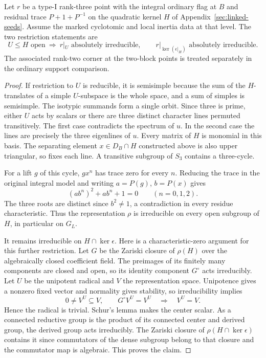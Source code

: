 \begin{lemma}
\label{lem:rank-three-host-restriction}
Let \(r\) be a type-I rank-three point with the integral
ordinary flag at \(B\) and residual trace \(P+1+P^{-1}\) on the
quadratic kernel \(H\) of Appendix~\ref{sec:linked-seeds}.
Assume the marked cyclotomic and local inertia data at that level.
The two restriction statements are
\[
 U\le H\text{ open}\ \Longrightarrow\ r|_U\text{ absolutely irreducible},
 \qquad r|_{\ker(\epsilon|_H)}\text{ absolutely irreducible}.
\] The associated
rank-two corner at the two-block points is treated separately
in the ordinary support comparison.
\end{lemma}

\begin{proof}
If restriction to \(U\) is reducible, it is semisimple because
the sum of the \(H\)-translates of a simple \(U\)-subspace
is the whole space, and a sum of simples is semisimple.
The isotypic summands form a single orbit. Since three
is prime, either \(U\) acts by scalars or there are three
distinct character lines permuted transitively. The first
case contradicts the spectrum of \(u\). In the second case
the lines are precisely the three eigenlines of \(u\).
Every matrix of \(H\) is monomial in this basis. The
separating element \(x\in D_B\cap H\) constructed above is
also upper triangular, so fixes each line. A transitive
subgroup of \(S_3\) contains a three-cycle.

For a lift \(g\)
of this cycle, \(gx^n\) has trace zero for every \(n\).
Reducing the trace in the original integral model and writing
\(a=P(g)\), \(b=P(x)\) gives
\[
         (ab^n)^2+ab^n+1=0\qquad(n=0,1,2).
\]
The three roots are distinct since \(b^2\ne1\), a
contradiction in every residue characteristic. Thus the
representation \(\rho\) is irreducible on every open
subgroup of \(H\), in particular on \(G_L\).

It remains irreducible on \(H\cap\ker\epsilon\). Here is a
characteristic-zero argument for this further restriction.
Let \(G\) be the Zariski closure of \(\rho(H)\) over the
algebraically closed coefficient field. The preimages of
its finitely many components are closed and open, so its
identity component \(G^\circ\) acts irreducibly. Let \(U\) be the unipotent radical and \(V\) the representation space. Unipotence gives a nonzero fixed vector and normality gives stability, so irreducibility implies
\[
 0\ne V^U\subseteq V,\qquad G^\circ V^U=V^U\quad\Longrightarrow\quad V^U=V .
\] Hence the radical is trivial.
Schur's lemma makes the center scalar. As a connected
reductive group is the product of its connected center and
derived group, the derived group acts irreducibly. The
Zariski closure of \(\rho(H\cap\ker\epsilon)\) contains it since
commutators of the dense subgroup belong to that closure
and the commutator map is algebraic. This proves the claim.

\end{proof}

